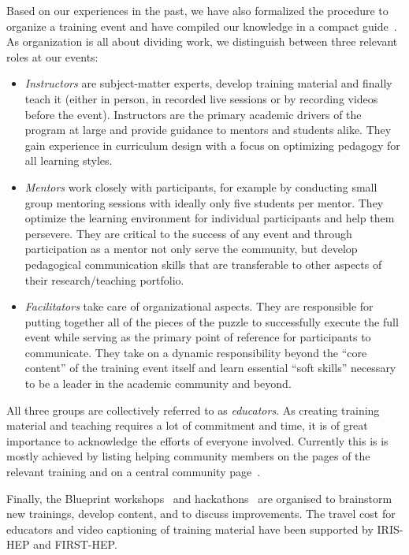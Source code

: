 \documentclass[twocolumn]{svjour3}          %
\begin{document}
Based on our experiences in the past, we have also formalized the procedure to organize  a training event and have compiled our knowledge in a compact guide~\cite{HSF-training-how-to}.
As organization is all about dividing work, we distinguish between three relevant roles at our events:
\begin{itemize}
    \item \emph{Instructors} are subject-matter experts, develop training material and finally teach it (either in person, in recorded live sessions or by recording videos before the event).  Instructors are the primary academic drivers of the program at large and provide guidance to mentors and students alike. They gain experience in curriculum design with a focus on optimizing pedagogy for all learning styles.
    \item \emph{Mentors} work closely with participants, for example by conducting small group mentoring sessions with ideally only five students per mentor. They optimize the learning environment for individual participants and help them persevere.  They are critical to the success of any event and through participation as a mentor not only serve the community, but develop pedagogical communication skills that are transferable to other aspects of their research/teaching portfolio.
    \item \emph{Facilitators} take care of organizational aspects. They are responsible for putting together all of the pieces of the puzzle to successfully execute the full event while serving as the primary point of reference for participants to communicate. They take on a dynamic responsibility beyond the \enquote{core content} of the training event itself and learn essential \enquote{soft skills} necessary to be a leader in the academic community and beyond.
\end{itemize}
All three groups are collectively referred to as \emph{educators}.
As creating training material and teaching requires a lot of commitment and time, it is of great importance to acknowledge the efforts of everyone involved. Currently this is is mostly achieved by listing helping community members on the pages of the relevant training and on a central community page~\cite{HSF-training-community}.

Finally, the Blueprint workshops~\cite{HSF-training-blueprint} and hack\-athons~\cite{HSF-training-hackathon} are organised to brainstorm new trainings, develop content, and to discuss improvements. The travel cost for educators and video captioning of training material have been supported by IRIS-HEP and FIRST-HEP.
\end{document}
